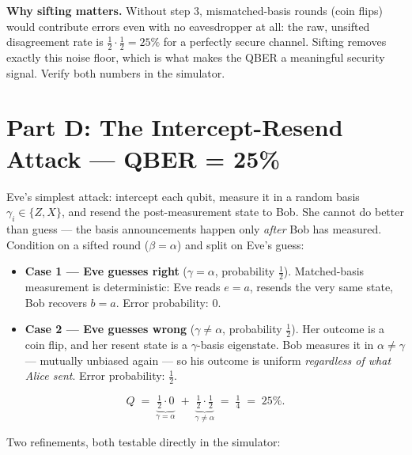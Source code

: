 \documentclass[a4paper,11pt]{article}
\begin{document}
\begin{warningbox}
\textbf{Why sifting matters.} Without step 3, mismatched-basis rounds (coin flips)
would contribute errors even with no eavesdropper at all: the raw, unsifted
disagreement rate is $\tfrac{1}{2} \cdot \tfrac{1}{2} = 25\%$ for a perfectly
secure channel. Sifting removes exactly this noise floor, which is what makes the
QBER a meaningful security signal. Verify both numbers in the simulator.
\end{warningbox}

\section{Part D: The Intercept-Resend Attack --- QBER = 25\%}

Eve's simplest attack: intercept each qubit, measure it in a random basis
$\gamma_i \in \{Z, X\}$, and resend the post-measurement state to Bob. She cannot
do better than guess --- the basis announcements happen only \emph{after} Bob has
measured. Condition on a sifted round ($\beta = \alpha$) and split on Eve's guess:

\begin{itemize}
    \item \textbf{Case 1 --- Eve guesses right} ($\gamma = \alpha$, probability
          $\tfrac{1}{2}$). Matched-basis measurement is deterministic: Eve reads
          $e = a$, resends the very same state, Bob recovers $b = a$.
          Error probability: $0$.
    \item \textbf{Case 2 --- Eve guesses wrong} ($\gamma \neq \alpha$, probability
          $\tfrac{1}{2}$). Her outcome is a coin flip, and her resent state is a
          $\gamma$-basis eigenstate. Bob measures it in $\alpha \neq \gamma$ ---
          mutually unbiased again --- so his outcome is uniform \emph{regardless of
          what Alice sent}. Error probability: $\tfrac{1}{2}$.
\end{itemize}

\begin{equation}
    Q \;=\; \underbrace{\tfrac{1}{2} \cdot 0}_{\gamma = \alpha}
       \;+\; \underbrace{\tfrac{1}{2} \cdot \tfrac{1}{2}}_{\gamma \neq \alpha}
       \;=\; \tfrac{1}{4} \;=\; 25\%.
    \label{eq:qber25}
\end{equation}

\noindent Two refinements, both testable directly in the simulator:
\end{document}
